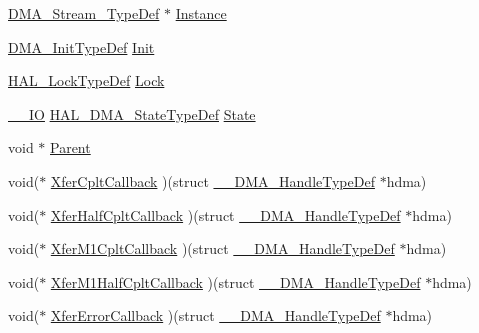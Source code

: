 \begin{DoxyCompactItemize}
\item 
\hyperlink{struct_d_m_a___stream___type_def}{D\+M\+A\+\_\+\+Stream\+\_\+\+Type\+Def} $\ast$ \hyperlink{struct_____d_m_a___handle_type_def_ac4b645b1c2beb1107dbec7dae98747e1}{Instance}
\item 
\hyperlink{struct_d_m_a___init_type_def}{D\+M\+A\+\_\+\+Init\+Type\+Def} \hyperlink{struct_____d_m_a___handle_type_def_a3792cb34cedb0e2ab204e41b53ef75ad}{Init}
\item 
\hyperlink{stm32f4xx__hal__def_8h_ab367482e943333a1299294eadaad284b}{H\+A\+L\+\_\+\+Lock\+Type\+Def} \hyperlink{struct_____d_m_a___handle_type_def_a005e867f695aa4b85aca665af7345b51}{Lock}
\item 
\hyperlink{core__sc300_8h_aec43007d9998a0a0e01faede4133d6be}{\+\_\+\+\_\+\+IO} \hyperlink{group___d_m_a___exported___types_ga9c012af359987a240826f29073bbe463}{H\+A\+L\+\_\+\+D\+M\+A\+\_\+\+State\+Type\+Def} \hyperlink{struct_____d_m_a___handle_type_def_a9759b676141bec799cdab94c3e08e6e4}{State}
\item 
void $\ast$ \hyperlink{struct_____d_m_a___handle_type_def_af42684decd26b1c5d49a529fcf99be30}{Parent}
\item 
void($\ast$ \hyperlink{struct_____d_m_a___handle_type_def_a4f323d8234b3f5f454a639e9df3cba23}{Xfer\+Cplt\+Callback} )(struct \hyperlink{struct_____d_m_a___handle_type_def}{\+\_\+\+\_\+\+D\+M\+A\+\_\+\+Handle\+Type\+Def} $\ast$hdma)
\item 
void($\ast$ \hyperlink{struct_____d_m_a___handle_type_def_a2e343c6a9135222a8efb8ca5bb5dad8c}{Xfer\+Half\+Cplt\+Callback} )(struct \hyperlink{struct_____d_m_a___handle_type_def}{\+\_\+\+\_\+\+D\+M\+A\+\_\+\+Handle\+Type\+Def} $\ast$hdma)
\item 
void($\ast$ \hyperlink{struct_____d_m_a___handle_type_def_a5968053a3674b44460c1aa150499e01d}{Xfer\+M1\+Cplt\+Callback} )(struct \hyperlink{struct_____d_m_a___handle_type_def}{\+\_\+\+\_\+\+D\+M\+A\+\_\+\+Handle\+Type\+Def} $\ast$hdma)
\item 
void($\ast$ \hyperlink{struct_____d_m_a___handle_type_def_aea9b02c5206e1b12380e0b83b5281e0d}{Xfer\+M1\+Half\+Cplt\+Callback} )(struct \hyperlink{struct_____d_m_a___handle_type_def}{\+\_\+\+\_\+\+D\+M\+A\+\_\+\+Handle\+Type\+Def} $\ast$hdma)
\item 
void($\ast$ \hyperlink{struct_____d_m_a___handle_type_def_a5905bba1de7dc9d803a50dfb44d0a9e8}{Xfer\+Error\+Callback} )(struct \hyperlink{struct_____d_m_a___handle_type_def}{\+\_\+\+\_\+\+D\+M\+A\+\_\+\+Handle\+Type\+Def} $\ast$hdma)

\end{DoxyCompactItemize}
